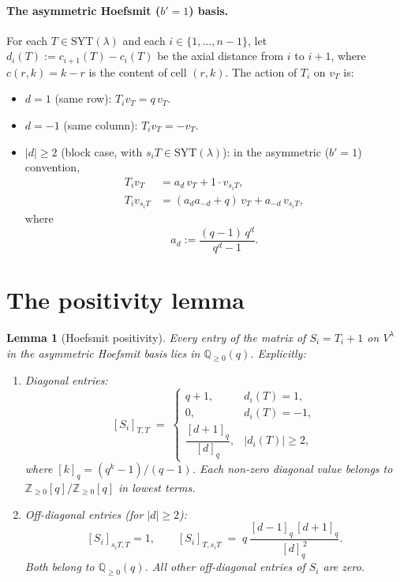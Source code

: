 \documentclass[11pt]{article}
\newtheorem{lemma}[theorem]{Lemma}
\theoremstyle{definition}
\newcommand{\Vlam}{V^{\lambda}}
\newcommand{\SYT}{\mathrm{SYT}}
\newcommand{\qint}[1]{[#1]_q}
\begin{document}
\paragraph{The asymmetric Hoefsmit ($b' = 1$) basis.}
For each $T \in \SYT(\lambda)$ and each $i \in \{1, \ldots, n-1\}$, let
$d_i(T) := c_{i+1}(T) - c_i(T)$ be the axial distance from $i$ to $i+1$,
where $c(r, k) = k - r$ is the content of cell $(r,k)$.  The action of
$T_i$ on $v_T$ is:
\begin{itemize}[topsep=2pt,itemsep=2pt]
\item $d = 1$ (same row): $T_i v_T = q\, v_T$.
\item $d = -1$ (same column): $T_i v_T = -v_T$.
\item $|d| \ge 2$ (block case, with $s_i T \in \SYT(\lambda)$): in the
asymmetric ($b' = 1$) convention,
\begin{align}
   T_i v_T &= a_d\, v_T + 1 \cdot v_{s_i T},
\label{eq:Ti-T}\\
   T_i v_{s_i T} &= (a_d a_{-d} + q)\, v_T + a_{-d}\, v_{s_i T},
\label{eq:Ti-sT}
\end{align}
where
\[
   a_d := \frac{(q-1)\,q^d}{q^d - 1}.
\]
\end{itemize}

\section{The positivity lemma}\label{sec:lemma1}

\begin{lemma}[Hoefsmit positivity]\label{lem:positivity}
Every entry of the matrix of $S_i = T_i + 1$ on $\Vlam$ in the
asymmetric Hoefsmit basis lies in $\mathbb{Q}_{\ge 0}(q)$.  Explicitly:
\begin{enumerate}[label=(\roman*),topsep=2pt,itemsep=2pt]
\item Diagonal entries:
\[
   [S_i]_{T,T} \;=\;
   \begin{cases}
      q+1, & d_i(T) = 1,\\
      0,   & d_i(T) = -1,\\
      \dfrac{\qint{d+1}}{\qint{d}}, & |d_i(T)| \ge 2,
   \end{cases}
\]
where $\qint{k} = (q^k - 1)/(q-1)$.  Each non-zero diagonal value
belongs to $\mathbb{Z}_{\ge 0}[q] / \mathbb{Z}_{\ge 0}[q]$ in lowest
terms.
\item Off-diagonal entries (for $|d| \ge 2$):
\[
   [S_i]_{s_i T, T} = 1, \qquad
   [S_i]_{T, s_i T} \;=\;
   q\,\frac{\qint{d-1}\,\qint{d+1}}{\qint{d}^{\,2}}.
\]
Both belong to $\mathbb{Q}_{\ge 0}(q)$.  All other off-diagonal
entries of $S_i$ are zero.
\end{enumerate}
\end{lemma}
\end{document}
